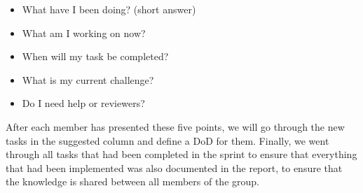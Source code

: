 \begin{itemize}
	\item{What have I been doing? (short answer)}
	\item{What am I working on now?}
	\item{When will my task be completed?}
	\item{What is my current challenge?}
	\item{Do I need help or reviewers?}
\end{itemize}
\noindent
After each member has presented these five points, we will go through the new tasks in the suggested column and define a DoD for them.
Finally, we went through all tasks that had been completed in the sprint to ensure that everything that had been implemented was also documented in the report, to ensure that the knowledge is shared between all members of the group.
